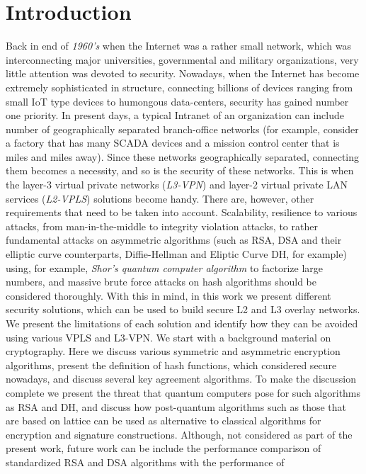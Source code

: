\chapter{Introduction}

Back in end of {\it 1960’s} when the Internet was a rather small 
network, which was interconnecting major universities, governmental 
and military organizations, very little attention was devoted to 
security. Nowadays, when the Internet has become extremely 
sophisticated in structure, connecting billions of devices ranging 
from small IoT type devices to humongous data-centers, security has 
gained number one priority. In present days, a typical Intranet of 
an organization can include number of geographically separated 
branch-office networks (for example, consider a factory that has 
many SCADA devices and a mission control center that is miles and 
miles away). Since these networks geographically separated, connecting 
them becomes a necessity, and so is the security of these networks. 
This is when the layer-3 virtual private networks ({\it L3-VPN}) and layer-2 
virtual private LAN services ({\it L2-VPLS}) solutions become handy. 
There are, however, other requirements that need to be taken into 
account. Scalability, resilience to various attacks, from man-in-the-middle 
to integrity violation attacks, to rather fundamental attacks on 
asymmetric algorithms (such as RSA, DSA and their elliptic curve 
counterparts, Diffie-Hellman and Eliptic Curve DH, for example) 
using, for example, {\it Shor’s quantum computer algorithm} to factorize 
large numbers, and massive brute force attacks on hash algorithms 
should be considered thoroughly. With this in mind, in this work we 
present different security solutions, which can be used to build secure 
L2 and L3 overlay networks. We present the limitations of each solution 
and identify how they can be avoided using various VPLS and L3-VPN.
We start with a background material on cryptography. 
Here we discuss various symmetric and asymmetric encryption algorithms, 
present the definition of hash functions, which considered secure nowadays, 
and discuss several key agreement algorithms. To make the discussion 
complete we present the threat that quantum computers pose for such 
algorithms as RSA and DH, and discuss how post-quantum algorithms such 
as those that are based on lattice can be used as alternative to classical 
algorithms for encryption and signature constructions. Although, not considered 
as part of the present work, future work can be include the performance 
comparison of standardized RSA and DSA algorithms with the performance of 
